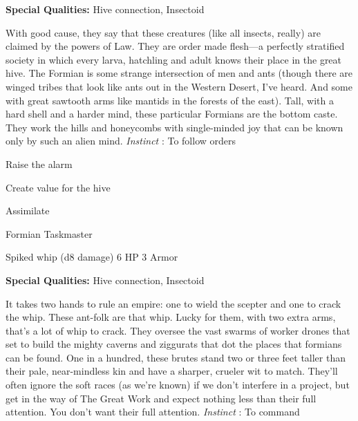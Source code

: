       
\startMonsterQualities
         {\bf Special Qualities:}  Hive connection, Insectoid
\stopMonsterQualities
       
\startMonsterDescription
With good cause, they say that these creatures (like all insects, really) are claimed by the powers of Law. They are order made flesh—a perfectly stratified society in which every larva, hatchling and adult knows their place in the great hive. The Formian is some strange intersection of men and ants (though there are winged tribes that look like ants out in the Western Desert, I’ve heard. And some with great sawtooth arms like mantids in the forests of the east). Tall, with a hard shell and a harder mind, these particular Formians are the bottom caste. They work the hills and honeycombs with single-minded joy that can be known only by such an alien mind. {\em Instinct} : To follow orders
\stopMonsterDescription
       
\startitemize[1,packed]
         
\item Raise the alarm

         
\item Create value for the hive

         
\item Assimilate

       
\stopitemize
       
\startMonsterName
Formian Taskmaster	 
\stopMonsterName
       

Spiked whip (d8 damage)	6 HP	3 Armor

       


       
\startMonsterQualities
         {\bf Special Qualities:}  Hive connection, Insectoid
\stopMonsterQualities
       
\startMonsterDescription
It takes two hands to rule an empire: one to wield the scepter and one to crack the whip. These ant-folk are that whip. Lucky for them, with two extra arms, that’s a lot of whip to crack. They oversee the vast swarms of worker drones that set to build the mighty caverns and ziggurats that dot the places that formians can be found. One in a hundred, these brutes stand two or three feet taller than their pale, near-mindless kin and have a sharper, crueler wit to match. They’ll often ignore the soft races (as we’re known) if we don’t interfere in a project, but get in the way of The Great Work and expect nothing less than their full attention. You don’t want their full attention. {\em Instinct} : To command
\stopMonsterDescription
       
